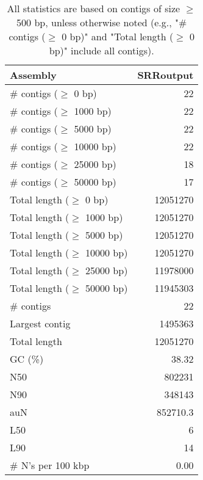 \documentclass[12pt,a4paper]{article}
\begin{document}
\begin{table}[ht]
\begin{center}
\caption{All statistics are based on contigs of size $\geq$ 500 bp, unless otherwise noted (e.g., "\# contigs ($\geq$ 0 bp)" and "Total length ($\geq$ 0 bp)" include all contigs).}
\begin{tabular}{|l*{1}{|r}|}
\hline
Assembly & SRRoutput \\ \hline
\# contigs ($\geq$ 0 bp) & 22 \\ \hline
\# contigs ($\geq$ 1000 bp) & 22 \\ \hline
\# contigs ($\geq$ 5000 bp) & 22 \\ \hline
\# contigs ($\geq$ 10000 bp) & 22 \\ \hline
\# contigs ($\geq$ 25000 bp) & 18 \\ \hline
\# contigs ($\geq$ 50000 bp) & 17 \\ \hline
Total length ($\geq$ 0 bp) & 12051270 \\ \hline
Total length ($\geq$ 1000 bp) & 12051270 \\ \hline
Total length ($\geq$ 5000 bp) & 12051270 \\ \hline
Total length ($\geq$ 10000 bp) & 12051270 \\ \hline
Total length ($\geq$ 25000 bp) & 11978000 \\ \hline
Total length ($\geq$ 50000 bp) & 11945303 \\ \hline
\# contigs & 22 \\ \hline
Largest contig & 1495363 \\ \hline
Total length & 12051270 \\ \hline
GC (\%) & 38.32 \\ \hline
N50 & 802231 \\ \hline
N90 & 348143 \\ \hline
auN & 852710.3 \\ \hline
L50 & 6 \\ \hline
L90 & 14 \\ \hline
\# N's per 100 kbp & 0.00 \\ \hline
\end{tabular}
\end{center}
\end{table}
\end{document}
